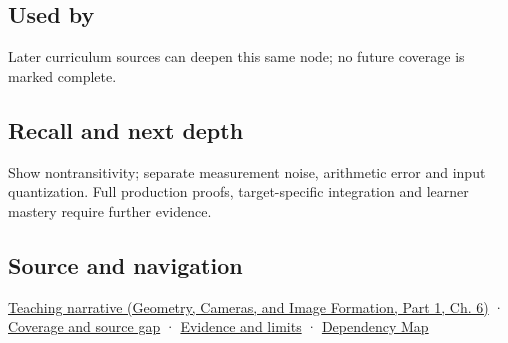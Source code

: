 \subsection{Used by}\label{appendix-b5b83329215b-used-by}

\hypertarget{appendix-b5b83329215b-used-by}{}

Later curriculum sources can deepen this same node; no future coverage is marked complete.

\subsection{Recall and next depth}\label{appendix-b5b83329215b-recall-and-next-depth}

\hypertarget{appendix-b5b83329215b-recall-and-next-depth}{}

Show nontransitivity; separate measurement noise, arithmetic error and input quantization. Full production proofs, target-specific integration and learner mastery require further evidence.

\subsection{Source and navigation}\label{appendix-b5b83329215b-source-and-navigation}

\hypertarget{appendix-b5b83329215b-source-and-navigation}{}

\href{../03-Geometry-Cameras-and-Image-Formation-P01/main.pdf\#nameddest=02-foundations-ii-ch037-reliability-begins-at-the-boundary-of-the-calculation}{Teaching narrative (Geometry, Cameras, and Image Formation, Part 1, Ch. 6)} · \hyperref[appendix-fd090d982a15-phase-6---parts-501-600]{Coverage and source gap} · \hyperref[appendix-a103e7846d21-phase-6---source-analysis-and-verification]{Evidence and limits} · \hyperref[appendix-4ad47bdd269a]{Dependency Map}
